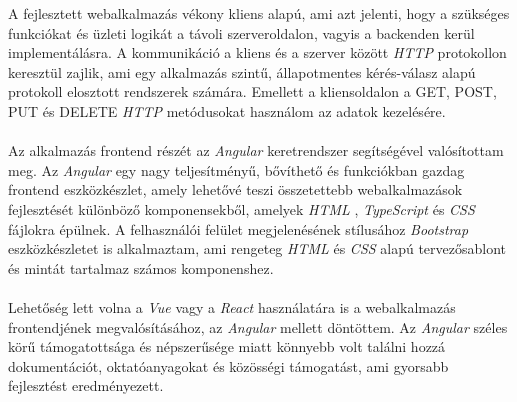 A fejlesztett webalkalmazás vékony kliens alapú, ami azt jelenti, hogy a szükséges funkciókat és üzleti logikát a távoli szerveroldalon, vagyis a backenden kerül implementálásra. A kommunikáció a kliens és a szerver között \textit{HTTP} \cite{http} protokollon keresztül zajlik, ami egy alkalmazás szintű, állapotmentes kérés-válasz alapú protokoll elosztott rendszerek számára. Emellett a kliensoldalon a GET, POST, PUT és DELETE \textit{HTTP} metódusokat használom az adatok kezelésére.\\
\\
Az alkalmazás frontend részét az \textit{Angular} \cite{angular} keretrendszer segítségével valósítottam meg. Az \textit{Angular} egy nagy teljesítményű, bővíthető és funkciókban gazdag frontend eszközkészlet, amely lehetővé teszi összetettebb webalkalmazások fejlesztését különböző komponensekből, amelyek \textit{HTML} \cite{html}, \textit{TypeScript} \cite{ts} és \textit{CSS} \cite{css} fájlokra épülnek. A felhasználói felület megjelenésének stílusához \textit{Bootstrap} \cite{bootstrap} eszközkészletet is alkalmaztam, ami rengeteg \textit{HTML} és \textit{CSS} alapú tervezősablont és mintát tartalmaz számos komponenshez.\\
\\
Lehetőség lett volna a \textit{Vue} \cite{vue} vagy a \textit{React} \cite{react} használatára is a webalkalmazás frontendjének megvalósításához, az \textit{Angular} \cite{angular} mellett döntöttem. Az \textit{Angular} széles körű támogatottsága és népszerűsége miatt könnyebb volt találni hozzá dokumentációt, oktatóanyagokat és közösségi támogatást, ami gyorsabb fejlesztést eredményezett.
